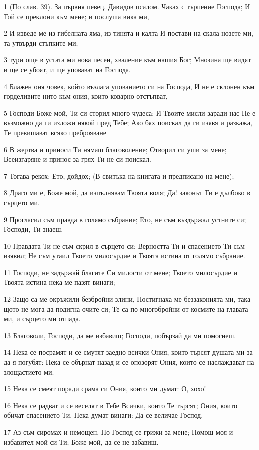 \par 1 (По слав. 39). За първия певец. Давидов псалом. Чаках с търпение Господа; И Той се преклони към мене; и послуша вика ми,
\par 2 И изведе ме из гибелната яма, из тинята и калта И постави на скала нозете ми, та утвърди стъпките ми;
\par 3 тури още в устата ми нова песен, хваление към нашия Бог; Мнозина ще видят и ще се убоят, и ще уповават на Господа.
\par 4 Блажен оня човек, който възлага упованието си на Господа, И не е склонен към горделивите нито към ония, които коварно отстъпват,
\par 5 Господи Боже мой, Ти си сторил много чудеса; И Твоите мисли заради нас Не е възможно да ги изложи някой пред Тебе; Ако бях поискал да ги изявя и разкажа, Те превишават всяко преброяване
\par 6 В жертва и приноси Ти нямаш благоволение; Отворил си уши за мене; Всеизгаряне и принос за грях Ти не си поискал.
\par 7 Тогава рекох: Ето, дойдох; (В свитъка на книгата и предписано на мене);
\par 8 Драго ми е, Боже мой, да изпълнявам Твоята воля; Да! законът Ти е дълбоко в сърцето ми.
\par 9 Прогласил съм правда в голямо събрание; Ето, не съм въздържал устните си; Господи, Ти знаеш.
\par 10 Правдата Ти не съм скрил в сърцето си; Верността Ти и спасението Ти съм изявил; Не съм утаил Твоето милосърдие и Твоята истина от голямо събрание.
\par 11 Господи, не задържай благите Си милости от мене; Твоето милосърдие и Твоята истина нека ме пазят винаги;
\par 12 Защо са ме окръжили безбройни злини, Постигнаха ме беззаконията ми, така щото не мога да подигна очите си; Те са по-многобройни от космите на главата ми, и сърцето ми отпада.
\par 13 Благоволи, Господи, да ме избавиш; Господи, побързай да ми помогнеш.
\par 14 Нека се посрамят и се смутят заедно всички Ония, които търсят душата ми за да я погубят: Нека се обърнат назад и се опозорят Ония, които се наслаждават на злощастието ми.
\par 15 Нека се смеят поради срама си Ония, които ми думат: О, хохо!
\par 16 Нека се радват и се веселят в Тебе Всички, които Те търсят; Ония, които обичат спасението Ти, Нека думат винаги: Да се величае Господ.
\par 17 Аз съм сиромах и немощен, Но Господ се грижи за мене; Помощ моя и избавител мой си Ти; Боже мой, да се не забавиш.

